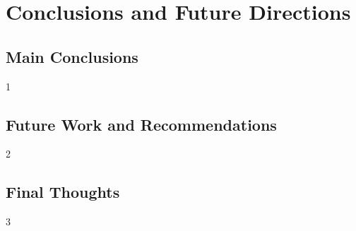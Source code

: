 



\chapter{Conclusions and Future Directions}

\section{Main Conclusions}

1
\section{Future Work and Recommendations}
2


\section{Final Thoughts}
3




